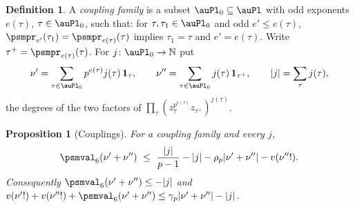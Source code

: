 \documentclass[10pt]{amsart}
\newtheorem{proposition}[theorem]{Proposition}
\theoremstyle{definition}
\newtheorem{definition}[theorem]{Definition}
\theoremstyle{remark}
\newcommand{\N}{\mathbb N}
\begin{document}
\begin{definition}\label{psm:def-family}
A \emph{coupling family} is a subset $\auPl_0\subseteq\auPl$ with odd exponents $e(\tau)$,
$\tau\in\auPl_0$, such that: for $\tau,\tau_1\in\auPl_0$ and odd $e'\le e(\tau)$,
$\psmpr_{e'}(\tau_1)=\psmpr_{e(\tau)}(\tau)$ implies $\tau_1=\tau$ and $e'=e(\tau)$. Write
$\tau^+=\psmpr_{e(\tau)}(\tau)$. For $j\colon\auPl_0\to\N$ put
\[
\nu'=\sum_{\tau\in\auPl_0}p^{e(\tau)}j(\tau)\,\mathbf 1_\tau,\qquad\nu''=\sum_{\tau\in\auPl_0}j(\tau)
\,\mathbf 1_{\tau^+},\qquad|j|=\sum_\tau j(\tau),
\]
the degrees of the two factors of $\prod_\tau(z_\tau^{p^{e(\tau)}}z_{\tau^+})^{j(\tau)}$.
\end{definition}

\begin{proposition}[Couplings]\label{psm:coupling}
For a coupling family and every $j$,
\[
\psmval_6(\nu'+\nu'')\ \le\ \frac{|j|}{p-1}-|j|-\rho_p|\nu'+\nu''|-v(\nu''!) .
\]
Consequently $\psmval_6(\nu'+\nu'')\le-|j|$ and $v(\nu'!)+v(\nu''!)+\psmval_6(\nu'+\nu'')\le
\gamma_p|\nu'+\nu''|-|j|$.
\end{proposition}
\end{document}

